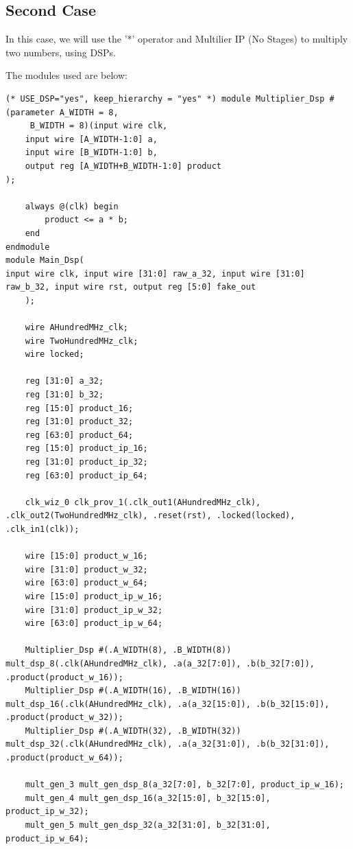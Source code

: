 \documentclass{report}
\begin{document}
\subsection{Second Case}
In this case, we will use the '*' operator and Multilier IP (No Stages) to multiply two numbers, using DSPs.

The modules used are below:
\begin{verbatim}
(* USE_DSP="yes", keep_hierarchy = "yes" *) module Multiplier_Dsp #(parameter A_WIDTH = 8,
     B_WIDTH = 8)(input wire clk,
    input wire [A_WIDTH-1:0] a,
    input wire [B_WIDTH-1:0] b,
    output reg [A_WIDTH+B_WIDTH-1:0] product
);

    always @(clk) begin
        product <= a * b;
    end
endmodule
module Main_Dsp(
input wire clk, input wire [31:0] raw_a_32, input wire [31:0] raw_b_32, input wire rst, output reg [5:0] fake_out
    );

    wire AHundredMHz_clk;
    wire TwoHundredMHz_clk;
    wire locked;

    reg [31:0] a_32;
    reg [31:0] b_32;
    reg [15:0] product_16;
    reg [31:0] product_32;
    reg [63:0] product_64;
    reg [15:0] product_ip_16;
    reg [31:0] product_ip_32;
    reg [63:0] product_ip_64;

    clk_wiz_0 clk_prov_1(.clk_out1(AHundredMHz_clk), .clk_out2(TwoHundredMHz_clk), .reset(rst), .locked(locked), .clk_in1(clk));

    wire [15:0] product_w_16;
    wire [31:0] product_w_32;
    wire [63:0] product_w_64;    
    wire [15:0] product_ip_w_16;
    wire [31:0] product_ip_w_32;
    wire [63:0] product_ip_w_64;    

    Multiplier_Dsp #(.A_WIDTH(8), .B_WIDTH(8)) mult_dsp_8(.clk(AHundredMHz_clk), .a(a_32[7:0]), .b(b_32[7:0]), .product(product_w_16));
    Multiplier_Dsp #(.A_WIDTH(16), .B_WIDTH(16)) mult_dsp_16(.clk(AHundredMHz_clk), .a(a_32[15:0]), .b(b_32[15:0]), .product(product_w_32));
    Multiplier_Dsp #(.A_WIDTH(32), .B_WIDTH(32)) mult_dsp_32(.clk(AHundredMHz_clk), .a(a_32[31:0]), .b(b_32[31:0]), .product(product_w_64));

    mult_gen_3 mult_gen_dsp_8(a_32[7:0], b_32[7:0], product_ip_w_16);
    mult_gen_4 mult_gen_dsp_16(a_32[15:0], b_32[15:0], product_ip_w_32);
    mult_gen_5 mult_gen_dsp_32(a_32[31:0], b_32[31:0], product_ip_w_64);


\end{verbatim}
\end{document}
